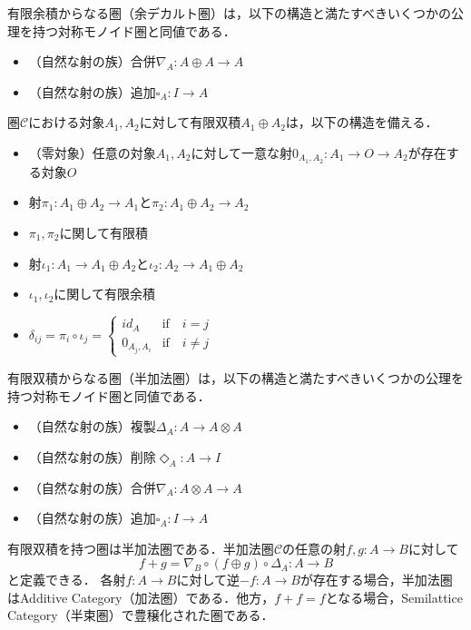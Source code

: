 \documentclass[type_judgement.tex]{subfiles}
\begin{document}
有限余積からなる圏（余デカルト圏）は，以下の構造と満たすべきいくつかの公理\cite{selinger09}を持つ対称モノイド圏と同値である．
\begin{itemize}
    \item （自然な射の族）合併$\nabla_A:A \oplus A \rightarrow A$
    \item （自然な射の族）追加$\square_A:I \rightarrow A$
\end{itemize}

\begin{defn}
圏$\mathcal{C}$における対象$A_1,A_2$に対して有限双積$A_1 \oplus A_2$は，以下の構造を備える．
\begin{itemize}
    \item （零対象）任意の対象$A_1,A_2$に対して一意な射$0_{A_1,A_2}:A_1 \rightarrow O \rightarrow A_2$が存在する対象$O$
    \item 射$\pi_1:A_1 \oplus A_2 \rightarrow A_1$と$\pi_2:A_1 \oplus A_2 \rightarrow A_2$
    \item $\pi_1,\pi_2$に関して有限積
    \item 射$\iota_1:A_1 \rightarrow A_1 \oplus A_2$と$\iota_2:A_2 \rightarrow A_1 \oplus A_2$
    \item$\iota_1,\iota_2$に関して有限余積
    \item
    $
    \delta_{ij} = \pi_i \circ \iota_j =
        \begin{cases}
            id_A        & \text{if}\quad i = j \\
            0_{A_j,A_i} & \text{if}\quad i \neq j
        \end{cases}
    $
\end{itemize}
\end{defn}

有限双積からなる圏（半加法圏）は，以下の構造と満たすべきいくつかの公理\cite{selinger09}を持つ対称モノイド圏と同値である．
\begin{itemize}
    \item （自然な射の族）複製$\Delta_A:A \rightarrow A \otimes A$
    \item （自然な射の族）削除$\Diamond_A:A \rightarrow I$
    \item （自然な射の族）合併$\nabla_A:A \otimes A \rightarrow A$
    \item （自然な射の族）追加$\square_A:I \rightarrow A$
\end{itemize}


\begin{defn}
有限双積を持つ圏は半加法圏\cite{LACK2012593}である．半加法圏$\mathcal{C}$の任意の射$f,g:A \rightarrow B$に対して
\begin{equation*}
    f+g = \nabla_B \circ (f \oplus g) \circ \Delta_A:A \rightarrow B
\end{equation*}
と定義できる\cite{maclane1950duality}．
各射$f:A \rightarrow B$に対して逆$-f:A \rightarrow B$が存在する場合，半加法圏はAdditive Category（加法圏）である．他方，$f+f=f$となる場合，Semilattice Category（半束圏）で豊穣化された圏である．
\end{defn}
\end{document}
